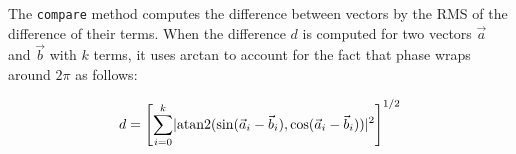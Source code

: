 The \lstinline{compare} method computes the difference between vectors by the RMS of the difference of their terms. When the difference \(d\) is computed for two vectors \(\vec{a}\) and \(\vec{b}\) with \(k\) terms, it uses arctan to account for the fact that phase wraps around \(2\pi\) as follows:

\begin{equation}
  d = \left[ \sum_{i=0}^{k}\lvert\operatorname{atan2}(\sin(\vec{a}_i - \vec{b}_i), \cos(\vec{a}_i - \vec{b}_i))\rvert^2 \right]^{1/2}
\end{equation}

